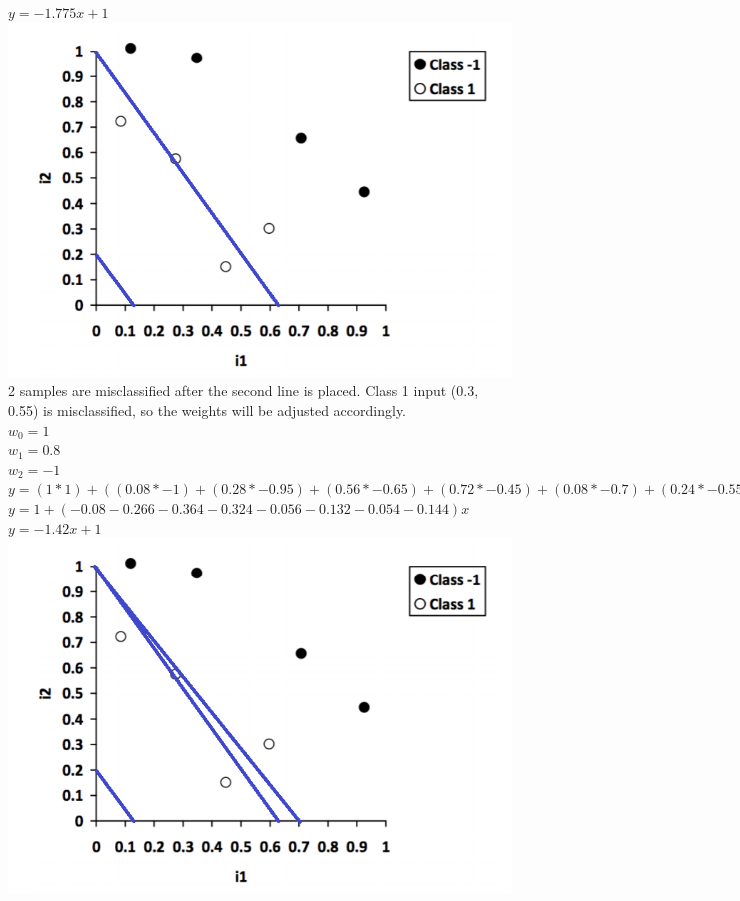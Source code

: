 \documentclass[11pt, oneside]{article}   	%
\begin{document}
\begin{flushleft}
$y=-1.775x+1$\\
\includegraphics[]{q4_2.png}
\\
2 samples are misclassified after the second line is placed. Class 1 input (0.3, 0.55) is misclassified, so the weights will be adjusted accordingly.\\
$w_0 = 1$\\
$w_1 = 0.8$\\
$w_2 = -1$\\
$y=(1*1)+((0.08*-1)+(0.28*-0.95)+(0.56*-0.65)+(0.72*-0.45)+(0.08*-0.7)+(0.24*-0.55)+(0.36*-0.15)+(0.48*-0.3))x$\\
$y=1+(-0.08-0.266-0.364-0.324-0.056-0.132-0.054-0.144)x$\\
$y=-1.42x+1$\\
\includegraphics[]{q4_3.png}
\\

\end{flushleft}
\end{document}
